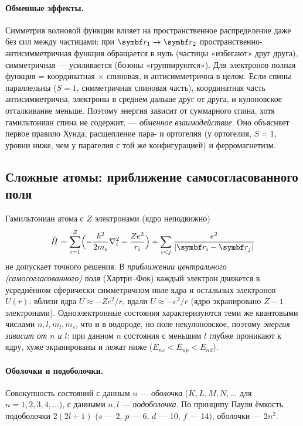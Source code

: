 \paragraph{Обменные эффекты.} Симметрия волновой функции влияет на пространственное распределение даже без
сил между частицами: при $\vect r_1\to\vect r_2$ пространственно-антисимметричная функция обращается в нуль
(частицы «избегают» друг друга), симметричная — усиливается (бозоны «группируются»). Для электронов
полная функция = координатная $\times$ спиновая, и антисимметрична в целом. Если спины параллельны ($S=1$,
симметричная спиновая часть), координатная часть антисимметрична, электроны в среднем дальше друг от друга,
и кулоновское отталкивание меньше. Поэтому энергия зависит от суммарного спина, хотя гамильтониан спина не
содержит, — \emph{обменное взаимодействие}. Оно объясняет первое правило Хунда, расщепление пара- и
ортогелия (у ортогелия, $S=1$, уровни ниже, чем у парагелия с той же конфигурацией) и ферромагнетизм.

\subsection{Сложные атомы: приближение самосогласованного поля}

Гамильтониан атома с $Z$ электронами (ядро неподвижно)
\[
  \op H=\sum_{i=1}^Z\Bigl(-\frac{\hbar^2}{2\mel}\nabla_i^2-\frac{Ze^2}{r_i}\Bigr)+\sum_{i<j}\frac{e^2}{|\vect r_i-\vect r_j|}
\]
не допускает точного решения. В \emph{приближении центрального (самосогласованного) поля} (Хартри--Фок) каждый
электрон движется в усреднённом сферически симметричном поле ядра и остальных электронов $U(r)$: вблизи
ядра $U\approx-Ze^2/r$, вдали $U\approx-e^2/r$ (ядро экранировано $Z-1$ электронами). Одноэлектронные
состояния характеризуются теми же квантовыми числами $n,l,m_l,m_s$, что и в водороде, но поле некулоновское, поэтому
\emph{энергия зависит от $n$ и $l$}: при данном $n$ состояния с меньшим $l$ глубже проникают к ядру, хуже
экранированы и лежат ниже ($E_{ns}<E_{np}<E_{nd}$).

\paragraph{Оболочки и подоболочки.} Совокупность состояний с данным $n$ — \emph{оболочка} ($K,L,M,N,\dots$ для
$n=1,2,3,4,\dots$), с данными $n,l$ — \emph{подоболочка}. По принципу Паули ёмкость подоболочки $2(2l+1)$
($s$ — 2, $p$ — 6, $d$ — 10, $f$ — 14), оболочки — $2n^2$.


